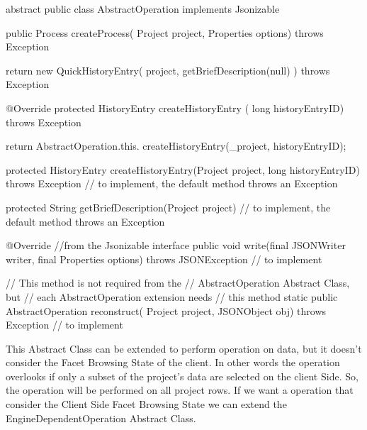 \begin{code}
abstract public class AbstractOperation implements Jsonizable {
   
   public Process createProcess( Project project,
                         Properties options) throws Exception {
      
      return new QuickHistoryEntry(
                 project, getBriefDescription(null)
                 ) throws Exception {
         
         @Override
         protected HistoryEntry createHistoryEntry (
                    long historyEntryID) throws Exception {
            
            return AbstractOperation.this.
                  createHistoryEntry(_project, historyEntryID);
         }
      }
   }
   
   protected HistoryEntry createHistoryEntry(Project project, 
                         long historyEntryID) throws Exception{
      // to implement, the default method throws an Exception
   }              
    
   protected String getBriefDescription(Project project) {
      // to implement, the default method throws an Exception          
   }
   
   @Override //from the Jsonizable interface
   public void write(final JSONWriter writer, 
                final Properties options) throws JSONException{
      // to implement
   }
}

   // This method is not required from the 
   // AbstractOperation Abstract Class, but
   // each AbstractOperation extension needs
   // this method
   static public AbstractOperation reconstruct(
           Project project, JSONObject obj) throws Exception {
      // to implement
   }
\end{code}
This Abstract Class can be extended to perform operation on data, but it doesn't consider the Facet Browsing State of the client. In other words the operation overlooks if only a subset of the project's data are selected on the client Side. So, the operation will be performed on all project rows. If we want a operation that consider the Client Side Facet Browsing State we can extend the EngineDependentOperation Abstract Class.

